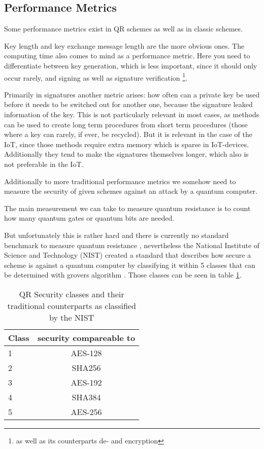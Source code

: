 \documentclass[conference]{IEEEtran}
\newcommand{\comment}[1]{}
\begin{document}
\subsection{Performance Metrics}
\comment{ %
\cite{springer_security_analyses}:
Qubit cost, Quantum Gate cost
} %

Some performance metrics exist in QR schemes as well as in classic schemes.

Key length and key exchange message length \cite{QR_algs} are the more obvious ones.
The computing time also comes to mind as a performance metric. Here you need to differentiate between key generation, which is less important, since it should only occur rarely, and signing as well as signature verification \footnote{as well as its counterparts de- and encryption}.

Primarily in signatures another metric arises: how often can a private key be used before it needs to be switched out for another one, because the signature leaked information of the key.
This is not particularly relevant in most cases, as methods can be used to create long term procedures from short term procedures (those where a key can rarely, if ever, be recycled).
But it is relevant in the case of the IoT, since those methods require extra memory which is sparse in IoT-devices. Additionally they tend to make the signatures themselves longer, which also is not preferable in the IoT. \cite{QR_algs}

Additionally to more traditional performance metrics we somehow need to measure the security of given schemes against an attack by a quantum computer.

The main measurement we can take to measure quantum resistance is to count how many quantum gates or quantum bits are needed.\cite{springer_security_analyses}

But unfortunately this is rather hard and there is currently no standard benchmark to measure quantum resistance \cite{QR_comparison}, nevertheless the National Institute of Science and Technology (NIST) created a standard that describes how secure a scheme is against a quantum computer by classifying it within 5 classes that can be determined with grovers algorithm \cite{QR_Iot_Lattice,Energy_comp}.
Those classes can be seen in table \ref{QR-classes}.

\begin{table}
    \label{QR-classes}
    \centering
    \caption{QR Security classes and their traditional counterparts as classified by the NIST}
    \begin{tabular}{|l | c|}
        \hline
        Class & security compareable to \\
        \hline
        1 & AES-128 \\
        2 & SHA256 \\
        3 & AES-192 \\
        4 & SHA384 \\
        5 & AES-256 \\
        \hline
    \end{tabular} 
\end{table}
\end{document}
